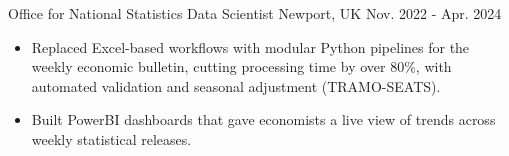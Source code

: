 \begin{cventries}
  \cventry
    {Office for National Statistics} %
    {Data Scientist} %
    {Newport, UK} %
    {Nov. 2022 - Apr. 2024} %
    {\renewcommand{\labelitemii}{\bullet}
      \begin{cvitems} %
        \item[] {\jobstyle{} 
            \begin{itemize} %
                \item {Replaced Excel-based workflows with modular Python pipelines for the weekly economic bulletin, cutting processing time by over 80\%, with automated validation and seasonal adjustment (TRAMO-SEATS).}
                \item {Built PowerBI dashboards that gave economists a live view of trends across weekly statistical releases.}
              \end{itemize}}  
      \end{cvitems}
    }        


\end{cventries}
